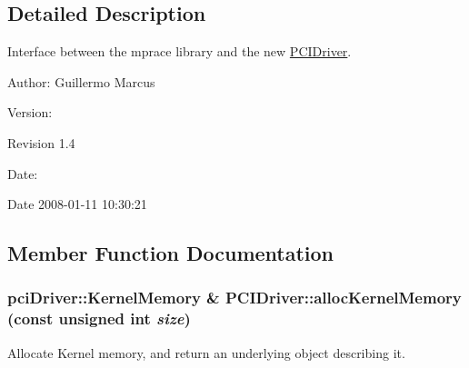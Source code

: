 \subsection{Detailed Description}
Interface between the mprace library and the new \hyperlink{classmprace_1_1PCIDriver}{PCIDriver}. 

\begin{Desc}
\item[Author:]Guillermo Marcus \end{Desc}
\begin{Desc}
\item[Version:]\begin{Desc}
\item[Revision]1.4 \end{Desc}
\end{Desc}
\begin{Desc}
\item[Date:]\begin{Desc}
\item[Date]2008-01-11 10:30:21 \end{Desc}
\end{Desc}




\subsection{Member Function Documentation}
\hypertarget{classmprace_1_1PCIDriver_a7}{
\subsubsection[allocKernelMemory]{\setlength{\rightskip}{0pt plus 5cm}pci\-Driver::Kernel\-Memory \& PCIDriver::alloc\-Kernel\-Memory (const unsigned int {\em size})}}
\label{classmprace_1_1PCIDriver_a7}


Allocate Kernel memory, and return an underlying object describing it. 

